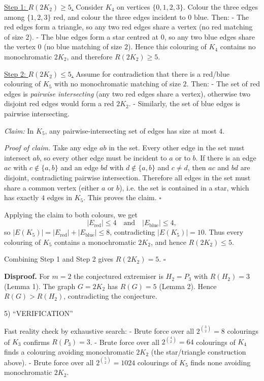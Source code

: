 \underline{Step 1: $R(2K_2)\ge 5$.}
Consider $K_4$ on vertices $\{0,1,2,3\}$. Colour the three edges among $\{1,2,3\}$ red, and colour the three edges incident to $0$ blue. Then:
- The red edges form a triangle, so any two red edges share a vertex (no red matching of size $2$).
- The blue edges form a star centred at $0$, so any two blue edges share the vertex $0$ (no blue matching of size $2$).
Hence this colouring of $K_4$ contains no monochromatic $2K_2$, and therefore $R(2K_2)\ge 5$.

\underline{Step 2: $R(2K_2)\le 5$.}
Assume for contradiction that there is a red/blue colouring of $K_5$ with no monochromatic matching of size $2$.
Then:
- The set of red edges is \emph{pairwise intersecting} (any two red edges share a vertex), otherwise two disjoint red edges would form a red $2K_2$.
- Similarly, the set of blue edges is pairwise intersecting.

\emph{Claim:} In $K_5$, any pairwise-intersecting set of edges has size at most $4$.

\emph{Proof of claim.}
Take any edge $ab$ in the set. Every other edge in the set must intersect $ab$, so every other edge must be incident to $a$ or to $b$.
If there is an edge $ac$ with $c\notin\{a,b\}$ and an edge $bd$ with $d\notin\{a,b\}$ and $c\neq d$, then $ac$ and $bd$ are disjoint, contradicting pairwise intersection. Therefore all edges in the set must share a common vertex (either $a$ or $b$), i.e. the set is contained in a star, which has exactly $4$ edges in $K_5$.
This proves the claim. $\square$

Applying the claim to both colours, we get
\[
|E_{\text{red}}|\le 4 \quad\text{and}\quad |E_{\text{blue}}|\le 4,
\]
so $|E(K_5)|=|E_{\text{red}}|+|E_{\text{blue}}|\le 8$, contradicting $|E(K_5)|=10$.
Thus every colouring of $K_5$ contains a monochromatic $2K_2$, and hence $R(2K_2)\le 5$.

Combining Step 1 and Step 2 gives $R(2K_2)=5$. $\square$

\textbf{Disproof.}
For $m=2$ the conjectured extremiser is $H_2=P_3$ with $R(H_2)=3$ (Lemma 1). The graph $G=2K_2$ has $R(G)=5$ (Lemma 2). Hence $R(G)>R(H_2)$, contradicting the conjecture.

5) “VERIFICATION”

Fast reality check by exhaustive search:
- Brute force over all $2^{\binom{3}{2}}=8$ colourings of $K_3$ confirms $R(P_3)=3$.
- Brute force over all $2^{\binom{4}{2}}=64$ colourings of $K_4$ finds a colouring avoiding monochromatic $2K_2$ (the star/triangle construction above).
- Brute force over all $2^{\binom{5}{2}}=1024$ colourings of $K_5$ finds none avoiding monochromatic $2K_2$.


